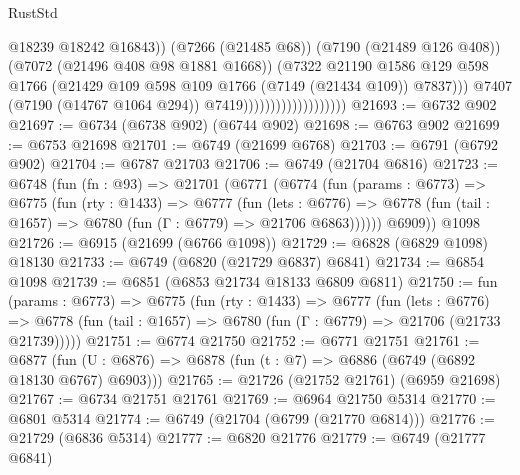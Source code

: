 \begin{lexlean}{RustStd}
\begin{coremodule}
                                                @18239
                                                @18242
                                                @16843))
                                            (@7266 (@21485 @68))
                                            (@7190 (@21489 @126 @408))
                                            (@7072 (@21496 @408 @98 @1881 @1668))
                                            (@7322
                                              @21190
                                              @1586
                                              @129
                                              @598
                                              @1766
                                              (@21429
                                                @109
                                                @598
                                                @109
                                                @1766
                                                (@7149 (@21434 @109))
                                                @7837)))
                                          @7407
                                          (@7190 (@14767 @1064 @294))
                                          @7419)))))))))))))))))))
@21693 := @6732 @902
@21697 := @6734 (@6738 @902) (@6744 @902)
@21698 := @6763 @902
@21699 := @6753 @21698
@21701 := @6749 (@21699 @6768)
@21703 := @6791 (@6792 @902)
@21704 := @6787 @21703
@21706 := @6749 (@21704 @6816)
@21723 := @6748
    (fun (fn : @93) =>
    @21701
      (@6771
        (@6774
          (fun (params : @6773) =>
          @6775
            (fun (rty : @1433) =>
            @6777
              (fun (lets : @6776) =>
              @6778 (fun (tail : @1657) => @6780 (fun (Γ : @6779) => @21706 @6863))))))
        @6909))
    @1098
@21726 := @6915 (@21699 (@6766 @1098))
@21729 := @6828 (@6829 @1098) @18130
@21733 := @6749 (@6820 (@21729 @6837) @6841)
@21734 := @6854 @1098
@21739 := @6851 (@6853 @21734 @18133 @6809 @6811)
@21750 := fun (params : @6773) =>
  @6775
    (fun (rty : @1433) =>
    @6777
      (fun (lets : @6776) =>
      @6778 (fun (tail : @1657) => @6780 (fun (Γ : @6779) => @21706 (@21733 @21739)))))
@21751 := @6774 @21750
@21752 := @6771 @21751
@21761 := @6877
    (fun (U : @6876) => @6878 (fun (t : @7) => @6886 (@6749 (@6892 @18130 @6767) @6903)))
@21765 := @21726 (@21752 @21761) (@6959 @21698)
@21767 := @6734 @21751 @21761
@21769 := @6964 @21750 @5314
@21770 := @6801 @5314
@21774 := @6749 (@21704 (@6799 (@21770 @6814)))
@21776 := @21729 (@6836 @5314)
@21777 := @6820 @21776
@21779 := @6749 (@21777 @6841)

\end{coremodule}
\end{lexlean}
